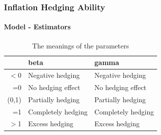 \documentclass[
	11pt, %
]{beamer}
\begin{document}
\begin{frame}
\frametitle{Inflation Hedging Ability}
\framesubtitle{Model - Estimators}
\begin{table}[ht]
\centering
\caption{The meanings of the parameters}
\label{parameters}
\begin{tabular}{rll}
  \hline
 & beta & gamma \\ 
  \hline
$<$0 & Negative hedging & Negative hedging \\ 
  =0 & No hedging effect & No hedging effect \\ 
  (0,1) & Partially hedging & Partially hedging \\ 
  =1 & Completely hedging & Completely hedging \\ 
  $>$1 & Excess hedging & Excess hedging \\ 
   \hline
\end{tabular}
\end{table}
\end{frame}
\end{document}

